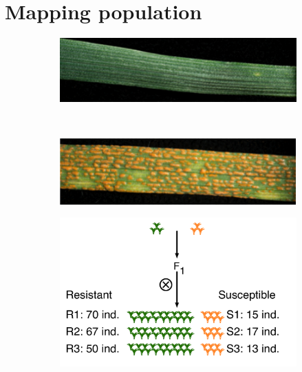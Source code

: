 \section{Mapping population}
\label{sub:mappingPopulation}
\begin{figure}
    \centering
     
     \begin{subfigure}[b]{0.4\textwidth}
        \caption{}
        \includegraphics[width=1\textwidth]{Yr15/Figures/population/Yr15Photo.png}
        \label{fig:yr15.yr15Photo}
    \end{subfigure}
    ~
    \begin{subfigure}[b]{0.4\textwidth}
        \caption{}
        \includegraphics[width=1\textwidth]{Yr15/Figures/population/AVSPhoto.png}
        \label{fig:yr15:avsPhoto}
    \end{subfigure}

     \begin{subfigure}[b]{0.9\textwidth}
     \caption{}
        \includegraphics[width=1\textwidth]{Yr15/Figures/population/F2Population.pdf} 
    \label{fig:yr15:f2}
	\end{subfigure}


\end{figure}
